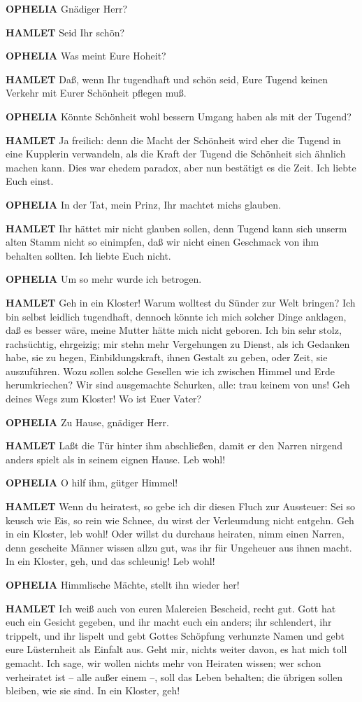 \textbf{OPHELIA}
Gnädiger Herr?

\textbf{HAMLET}
Seid Ihr schön?

\textbf{OPHELIA}
Was meint Eure Hoheit?

\textbf{HAMLET}
Daß, wenn Ihr tugendhaft und schön seid, Eure Tugend keinen Verkehr mit Eurer
Schönheit pflegen muß.

\textbf{OPHELIA}
Könnte Schönheit wohl bessern Umgang haben als mit der Tugend?

\textbf{HAMLET}
Ja freilich: denn die Macht der Schönheit wird eher die Tugend in eine
Kupplerin verwandeln, als die Kraft der Tugend die Schönheit sich ähnlich
machen kann. Dies war ehedem paradox, aber nun bestätigt es die Zeit. Ich
liebte Euch einst.

\textbf{OPHELIA}
In der Tat, mein Prinz, Ihr machtet michs glauben.

\textbf{HAMLET}
Ihr hättet mir nicht glauben sollen, denn Tugend kann sich unserm alten Stamm
nicht so einimpfen, daß wir nicht einen Geschmack von ihm behalten sollten. Ich
liebte Euch nicht.

\textbf{OPHELIA}
Um so mehr wurde ich betrogen.

\textbf{HAMLET}
Geh in ein Kloster! Warum wolltest du Sünder zur Welt bringen? Ich bin selbst
leidlich tugendhaft, dennoch könnte ich mich solcher Dinge anklagen, daß es
besser wäre, meine Mutter hätte mich nicht geboren. Ich bin sehr stolz,
rachsüchtig, ehrgeizig; mir stehn mehr Vergehungen zu Dienst, als ich Gedanken
habe, sie zu hegen, Einbildungskraft, ihnen Gestalt zu geben, oder Zeit, sie
auszuführen. Wozu sollen solche Gesellen wie ich zwischen Himmel und Erde
herumkriechen? Wir sind ausgemachte Schurken, alle: trau keinem von uns! Geh
deines Wegs zum Kloster! Wo ist Euer Vater?

\textbf{OPHELIA}
Zu Hause, gnädiger Herr.

\textbf{HAMLET}
Laßt die Tür hinter ihm abschließen, damit er den Narren nirgend anders spielt
als in seinem eignen Hause. Leb wohl!

\textbf{OPHELIA}
O hilf ihm, gütger Himmel!

\textbf{HAMLET}
Wenn du heiratest, so gebe ich dir diesen Fluch zur Aussteuer: Sei so keusch
wie Eis, so rein wie Schnee, du wirst der Verleumdung nicht entgehn. Geh in ein
Kloster, leb wohl! Oder willst du durchaus heiraten, nimm einen Narren, denn
gescheite Männer wissen allzu gut, was ihr für Ungeheuer aus ihnen macht. In
ein Kloster, geh, und das schleunig! Leb wohl!

\textbf{OPHELIA}
Himmlische Mächte, stellt ihn wieder her!

\textbf{HAMLET}
Ich weiß auch von euren Malereien Bescheid, recht gut. Gott hat euch ein
Gesicht gegeben, und ihr macht euch ein anders; ihr schlendert, ihr trippelt,
und ihr lispelt und gebt Gottes Schöpfung verhunzte Namen und gebt eure
Lüsternheit als Einfalt aus. Geht mir, nichts weiter davon, es hat mich toll
gemacht. Ich sage, wir wollen nichts mehr von Heiraten wissen; wer schon
verheiratet ist -- alle außer einem --, soll das Leben behalten; die übrigen
sollen bleiben, wie sie sind. In ein Kloster, geh!
